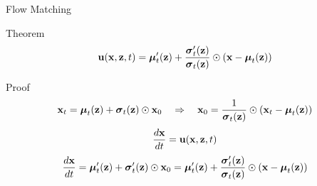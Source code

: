 \begin{frame}{Flow Matching}
	\begin{block}{Theorem}
		\vspace{-0.3cm}
		\[
			\bu(\bx, \bz, t) =  \bmu_t'(\bz) + \frac{\bsigma_t'(\bz)}{\bsigma_t(\bz)} \odot (\bx - \bmu_t(\bz))
		\]
		\vspace{-0.3cm}
	\end{block}
	\begin{block}{Proof}
	\vspace{-0.5cm}
	\[
		\bx_t = \bmu_t(\bz) + \bsigma_t(\bz) \odot \bx_0 \quad \Rightarrow \quad \bx_0 = \frac{1}{\bsigma_t(\bz)} \odot (\bx_t - \bmu_t(\bz))
	\]
	\[
		 \frac{d\bx}{dt} = \bu(\bx, \bz, t)
	\]
	\[
		\frac{d\bx}{dt} = \bmu_t'(\bz) + \bsigma_t'(\bz) \odot \bx_0 =  \bmu_t'(\bz) + \frac{\bsigma_t'(\bz)}{\bsigma_t(\bz)} \odot (\bx - \bmu_t(\bz))
	\]
	\end{block}
\end{frame}
